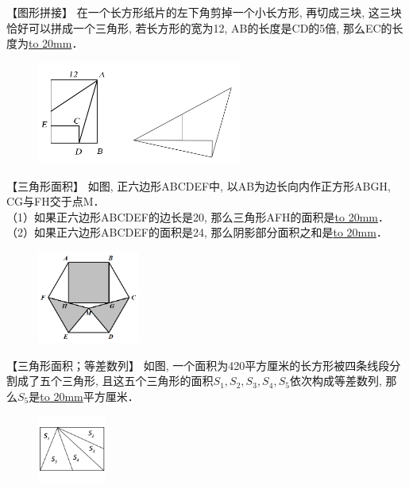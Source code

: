 \item {
    【图形拼接】
    {在一个长方形纸片的左下角剪掉一个小长方形, 
    再切成三块,  这三块恰好可以拼成一个三角形, 
    若长方形的宽为12, AB的长度是CD的5倍, 
    那么EC的长度为\underline{\hbox to 20mm{}}．} 
    \begin{figure}[H] 
        \centering
        \includegraphics[width=0.6\textwidth]{./pics/Chapter_2/6.png}
    \end{figure}
    \vspace{1cm}
}

\item {
    【三角形面积】
    如图, 正六边形ABCDEF中, 以AB为边长向内作正方形ABGH, CG与FH交于点M．\\
    （1）如果正六边形ABCDEF的边长是20, 那么三角形AFH的面积是\underline{\hbox to 20mm{}}．\\
    （2）如果正六边形ABCDEF的面积是24, 那么阴影部分面积之和是\underline{\hbox to 20mm{}}．
    \begin{figure}[H] 
        \centering
        \includegraphics[width=0.3\textwidth]{./pics/Chapter_2/3.png}
    \end{figure}
    \vspace{1cm}
}

\item {
    【三角形面积；等差数列】
    如图, 一个面积为420平方厘米的长方形被四条线段分割成了五个三角形, 且这五个三角形的面积$S_1, S_2, S_3, S_4, S_5$依次构成等差数列, 那么$S_5$是\underline{\hbox to 20mm{}}平方厘米．
    \begin{figure}[H] 
        \centering
        \includegraphics[width=0.2\textwidth]{./pics/Chapter_2/16.png}
    \end{figure}
    \vspace{1cm}
}

